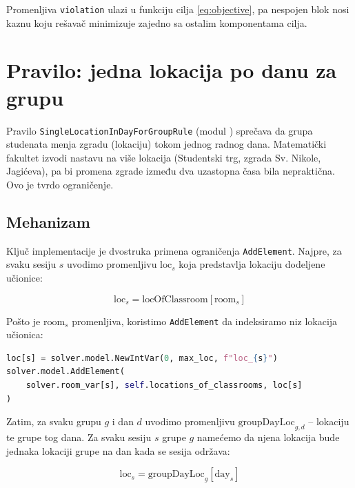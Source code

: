 \documentclass[12pt,oneside]{memoir}
\begin{document}
Promenljiva \texttt{violation} ulazi u funkciju cilja
\eqref{eq:objective}, pa nespojen blok nosi kaznu koju rešavač
minimizuje zajedno sa ostalim komponentama cilja.

\section{Pravilo: jedna lokacija po danu za grupu}
\label{sec:rule_location}

Pravilo \texttt{SingleLocationInDayForGroupRule} (modul
) sprečava da
grupa studenata menja zgradu (lokaciju) tokom jednog radnog dana.
Matematički fakultet izvodi nastavu na više lokacija (Studentski trg,
zgrada Sv. Nikole, Jagićeva), pa bi promena zgrade između dva uzastopna časa
bila nepraktična. Ovo je tvrdo ograničenje.

\subsection{Mehanizam}

Ključ implementacije je dvostruka primena ograničenja
\texttt{AddElement}. Najpre, za svaku sesiju $s$ uvodimo promenljivu
$\text{loc}_s$ koja predstavlja lokaciju dodeljene učionice:

\begin{equation}
\text{loc}_s = \text{locOfClassroom}[\text{room}_s]
\end{equation}

Pošto je $\text{room}_s$ promenljiva, koristimo \texttt{AddElement} da
indeksiramo niz lokacija učionica:

\begin{english}
\begin{lstlisting}[language=Python, caption={Kanalisanje učionice u lokaciju}]
loc[s] = solver.model.NewIntVar(0, max_loc, f"loc_{s}")
solver.model.AddElement(
    solver.room_var[s], self.locations_of_classrooms, loc[s]
)
\end{lstlisting}
\end{english}

Zatim, za svaku grupu $g$ i dan $d$ uvodimo promenljivu
$\text{groupDayLoc}_{g,d}$ -- lokaciju te grupe tog dana. Za svaku
sesiju $s$ grupe $g$ namećemo da njena lokacija bude jednaka lokaciji
grupe na dan kada se sesija održava:

\begin{equation}
\text{loc}_s = \text{groupDayLoc}_{g}[\text{day}_s]
\end{equation}
\end{document}

